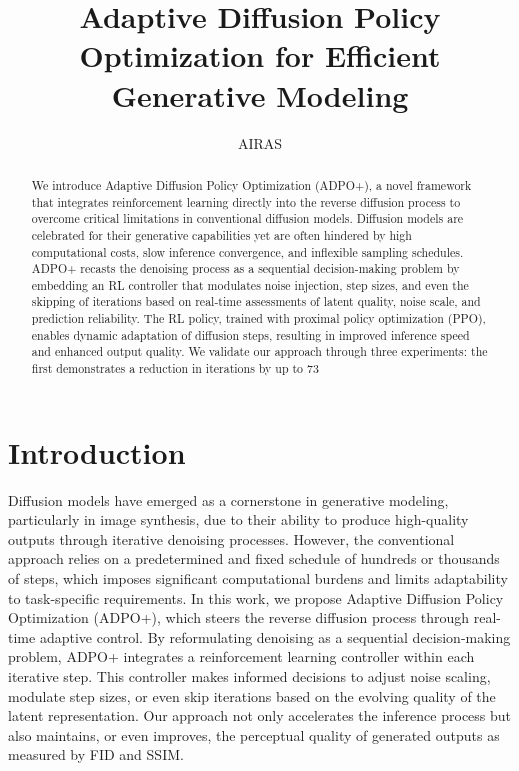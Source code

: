 \documentclass{article} %
\title{Adaptive Diffusion Policy Optimization for Efficient Generative Modeling}
\author{AIRAS}
\begin{document}
\maketitle

\begin{abstract}
We introduce Adaptive Diffusion Policy Optimization (ADPO+), a novel framework that integrates reinforcement learning directly into the reverse diffusion process to overcome critical limitations in conventional diffusion models. Diffusion models are celebrated for their generative capabilities yet are often hindered by high computational costs, slow inference convergence, and inflexible sampling schedules. ADPO+ recasts the denoising process as a sequential decision-making problem by embedding an RL controller that modulates noise injection, step sizes, and even the skipping of iterations based on real-time assessments of latent quality, noise scale, and prediction reliability. The RL policy, trained with proximal policy optimization (PPO), enables dynamic adaptation of diffusion steps, resulting in improved inference speed and enhanced output quality. We validate our approach through three experiments: the first demonstrates a reduction in iterations by up to 73%
\end{abstract}

\section{Introduction}
\label{sec:intro}
Diffusion models have emerged as a cornerstone in generative modeling, particularly in image synthesis, due to their ability to produce high-quality outputs through iterative denoising processes. However, the conventional approach relies on a predetermined and fixed schedule of hundreds or thousands of steps, which imposes significant computational burdens and limits adaptability to task-specific requirements. In this work, we propose Adaptive Diffusion Policy Optimization (ADPO+), which steers the reverse diffusion process through real-time adaptive control. By reformulating denoising as a sequential decision-making problem, ADPO+ integrates a reinforcement learning controller within each iterative step. This controller makes informed decisions to adjust noise scaling, modulate step sizes, or even skip iterations based on the evolving quality of the latent representation. Our approach not only accelerates the inference process but also maintains, or even improves, the perceptual quality of generated outputs as measured by FID and SSIM.
\end{document}
